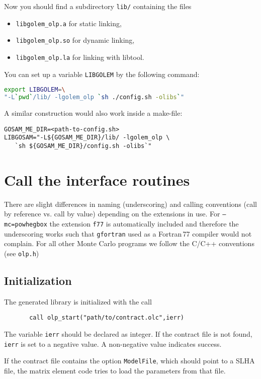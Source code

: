 Now you should find a subdirectory \texttt{lib/} containing the files
\begin{itemize}
\item \texttt{libgolem\_olp.a} for static linking,
\item \texttt{libgolem\_olp.so} for dynamic linking,
\item \texttt{libgolem\_olp.la} for linking with libtool.
\end{itemize}

You can set up a variable \texttt{LIBGOLEM} by the following command:
\begin{lstlisting}[language=bash]
export LIBGOLEM=\
"-L`pwd`/lib/ -lgolem_olp `sh ./config.sh -olibs`"
\end{lstlisting}
A similar construction would also work inside a make-file:
\begin{lstlisting}[language=Make]
GOSAM_ME_DIR=<path-to-config.sh>
LIBGOSAM="-L${GOSAM_ME_DIR}/lib/ -lgolem_olp \
   `sh ${GOSAM_ME_DIR}/config.sh -olibs`"
\end{lstlisting}

\section{Call the interface routines}
There are slight differences in naming (underscoring) and calling
conventions (call by reference vs. call by value) depending on the
extensions in use. For \texttt{--mc=powhegbox} the extension \texttt{f77}
is automatically included and therefore the underscoring works such that
\texttt{gfortran} used as a Fortran\,77 compiler would not complain.
For all other Monte Carlo programs we follow the C/C++ conventions
(see \texttt{olp.h})

\subsection{Initialization}
The generated \gosam{} library is initialized with the call
\begin{lstlisting}
       call olp_start("path/to/contract.olc",ierr)
\end{lstlisting}
The variable \texttt{ierr} should be declared as integer. If the contract
file is not found, \texttt{ierr} is set to a negative value. A non-negative
value indicates success.

If the contract file contains the option
\texttt{ModelFile}, which should point to a SLHA file,
the matrix element code tries to load the parameters from that file.

